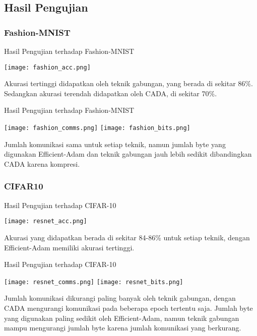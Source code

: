 \subsection{Hasil Pengujian}
\subsubsection{Fashion-MNIST}
\begin{frame}{Hasil Pengujian terhadap Fashion-MNIST}
  \begin{center}
    \texttt{[image: fashion\_acc.png]}
  \end{center}
  Akurasi tertinggi didapatkan oleh teknik gabungan, yang berada di sekitar 86\%. Sedangkan akurasi terendah didapatkan oleh CADA, di sekitar 70\%.
\end{frame}

\begin{frame}{Hasil Pengujian terhadap Fashion-MNIST}
  \begin{center}
    \texttt{[image: fashion\_comms.png]}
    \texttt{[image: fashion\_bits.png]}
  \end{center}
  Jumlah komunikasi sama untuk setiap teknik, namun jumlah byte yang digunakan Efficient-Adam dan teknik gabungan jauh lebih sedikit dibandingkan CADA karena kompresi.
\end{frame}

\subsubsection{CIFAR10}
\begin{frame}{Hasil Pengujian terhadap CIFAR-10}
  \begin{center}
    \texttt{[image: resnet\_acc.png]}
  \end{center}
  Akurasi yang didapatkan berada di sekitar 84-86\% untuk setiap teknik, dengan Efficient-Adam memiliki akurasi tertinggi.
\end{frame}

\begin{frame}{Hasil Pengujian terhadap CIFAR-10}
  \begin{center}
    \texttt{[image: resnet\_comms.png]}
    \texttt{[image: resnet\_bits.png]}
  \end{center}
  Jumlah komunikasi dikurangi paling banyak oleh teknik gabungan, dengan CADA mengurangi komunikasi pada beberapa epoch tertentu saja. Jumlah byte yang digunakan paling sedikit oleh Efficient-Adam, namun teknik gabungan mampu mengurangi jumlah byte karena jumlah komunikasi yang berkurang.
\end{frame}
